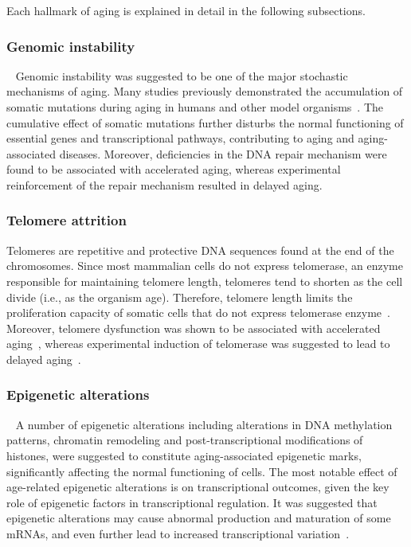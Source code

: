 Each hallmark of aging is explained in detail in the following subsections.
\subsubsection{Genomic instability}~\label{hmark:genomic.instability}
Genomic instability was suggested to be one of the major stochastic mechanisms of aging. 
Many studies previously demonstrated the accumulation of somatic mutations during aging in humans and other model organisms~\cite{Moskalev2013, Lodato2018, Lombard2005, Vijg2004, Lu2004}.
The cumulative effect of somatic mutations further disturbs the normal functioning of essential genes and transcriptional pathways, contributing to aging and aging-associated diseases.
Moreover, deficiencies in the DNA repair mechanism were found to be associated with accelerated aging, whereas experimental reinforcement of the repair mechanism resulted in delayed aging.

\subsubsection{Telomere attrition}
Telomeres are repetitive and protective DNA sequences found at the end of the chromosomes.
Since most mammalian cells do not express telomerase, an enzyme responsible for maintaining telomere length, 
telomeres tend to shorten as the cell divide (i.e., as the organism age). 
Therefore, telomere length limits the proliferation capacity of somatic cells that do not express telomerase enzyme~\cite{Blasco2007}.
Moreover, telomere dysfunction was shown to be associated with accelerated aging~\cite{Armanios2009}, 
whereas experimental induction of telomerase was suggested to lead to delayed aging~\cite{Tomas2008}.

\subsubsection{Epigenetic alterations}~\label{hmark:epigenetic}
A number of epigenetic alterations including alterations in DNA methylation patterns, chromatin remodeling and post-transcriptional modifications of histones, 
were suggested to constitute aging-associated epigenetic marks, significantly affecting the normal functioning of cells.
The most notable effect of age-related epigenetic alterations is on transcriptional outcomes, given the key role of epigenetic factors in transcriptional regulation.
It was suggested that epigenetic alterations may cause abnormal production and maturation of some mRNAs, and even further lead to increased transcriptional variation~\cite{Lopez2013}.

